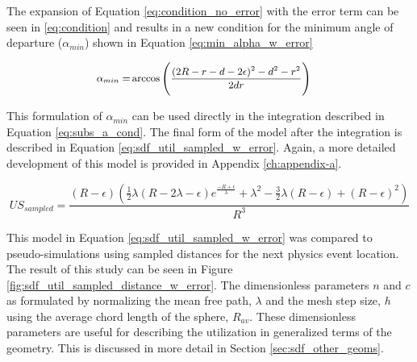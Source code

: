 The expansion of Equation \ref{eq:condition_no_error} with the error term can be seen
in \ref{eq:condition} and results in a new condition for the minimum angle of
departure ($\alpha_{min}$) shown in Equation \ref{eq:min_alpha_w_error}

\begin{equation}
\small
\begin{split}
\alpha_{min} =& \arccos\Bigg ( \frac{(2R-r-d-2\epsilon)^2-d^2-r^2}{2 d r} \Bigg )
\end{split}
\label{eq:min_alpha_w_error}
\end{equation}

This formulation of $\alpha_{min}$ can be used directly in the integration described
in Equation \ref{eq:subs_a_cond}. The final form of the model after the
integration is described in Equation \ref{eq:sdf_util_sampled_w_error}. Again, a
more detailed development of this model is provided in Appendix \ref{ch:appendix-a}.

\begin{equation}
  US_{sampled} = \frac{(R-\epsilon) (\frac{1}{2} \lambda ( R - 2\lambda - \epsilon ) e^{\frac{-R + \epsilon}{\lambda}} + \lambda^{2} - \frac{3}{2}\lambda(R - \epsilon) + (R-\epsilon)^{2})}{R^3}
  \label{eq:sdf_util_sampled_w_error}
\end{equation}



This model in Equation \ref{eq:sdf_util_sampled_w_error} was compared to
pseudo-simulations using sampled distances for the next physics event
location. The result of this study can be seen in Figure
\ref{fig:sdf_util_sampled_distance_w_error}. The dimensionless parameters $n$
and $c$ as formulated by normalizing the mean free path, $\lambda$ and the mesh
step size, $h$ using the average chord length of the sphere, $R_{av}$. These
dimensionless parameters are useful for describing the utilization in
generalized terms of the geometry. This is discussed in more detail in
Section \ref{sec:sdf_other_geoms}.

